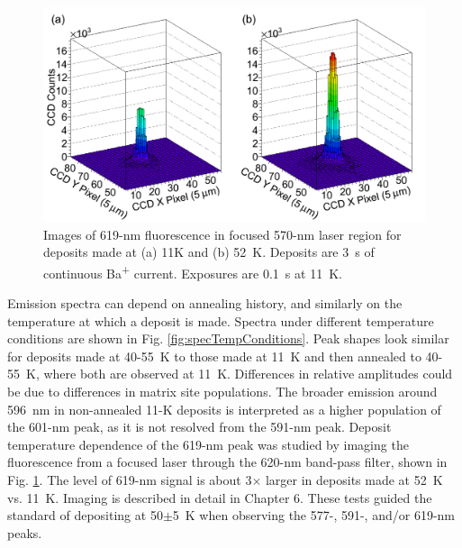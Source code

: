 \begin{figure} [h]
        \centering
                \includegraphics[width=.8\textwidth]{figures/619_deposit_temp.png}
                \caption{Images of 619-nm fluorescence in focused 570-nm laser region for deposits made at (a) 11K and (b) 52~K.  Deposits are 3~s of continuous Ba\textsuperscript{+} current.  Exposures are 0.1~s at 11~K.}
\label{fig:specTempConditions619}
\end{figure}

Emission spectra can depend on annealing history, and similarly on the temperature at which a deposit is made.  Spectra under different temperature conditions are shown in Fig. \ref{fig:specTempConditions}.  Peak shapes look similar for deposits made at 40-55~K to those made at 11~K and then annealed to 40-55~K, where both are observed at 11~K.  Differences in relative amplitudes could be due to differences in matrix site populations.  The broader emission around 596~nm in non-annealed 11-K deposits is interpreted as a higher population of the 601-nm peak, as it is not resolved from the 591-nm peak.  Deposit temperature dependence of the 619-nm peak was studied by imaging the fluorescence from a focused laser through the 620-nm band-pass filter, shown in Fig. \ref{fig:specTempConditions619}.  The level of 619-nm signal is about 3$\times$ larger in deposits made at 52~K vs. 11~K.  Imaging is described in detail in Chapter 6.  These tests guided the standard of depositing at 50$\pm$5~K when observing the 577-, 591-, and/or 619-nm peaks.




